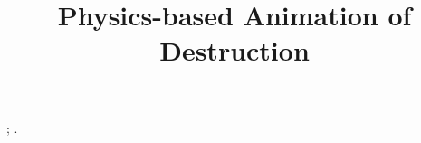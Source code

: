 \documentclass[review]{acmsiggraph-job}
\title{Physics-based Animation of Destruction}
\author{}
\newcommand{\theKeywords}{}
\begin{document}


\maketitle

\begin{abstract}
\end{abstract}
\begin{CRcatlist}
  ;
  .
\end{CRcatlist}

\keywordlist{\theKeywords}

\TOGlinkslist


\newcommand{\adam}[1]{{\color{AdamColor} #1}}

\newcommand{\etal}{and colleagues}
\newcommand{\Mueller}{M\"uller}
\newcommand{\BM}[1]{\B{#1}}
\newcommand{\B}[1]{\mathit{\mathbf{#1}}}
\newcommand{\Per}{\%}
\newcommand{\Unit}[1]{{\mbox{$\,\mathrm{#1}$}}}
\newcommand{\Snit}[1]{{\mbox{\small$\mathrm{#1}$}}}
\newcommand{\Tr}[1]{\mathrm{Tr}\left(#1\right)}
\newcommand{\Hz}{\Unit{Hz}}
\newcommand{\MHz}{\Unit{MHz}}
\newcommand{\GHz}{\Unit{GHz}}
\newcommand{\Sec}{\Unit{sec}}
\newcommand{\SPF}{\Unit{sec/frame}}
\newcommand{\Min}{\Unit{min}}
\newcommand{\Max}{\Unit{max}}
\newcommand{\M}{\Unit{m}}
\newcommand{\Nab}{\B{\nabla}}
\newcommand{\TP}{^\mathsf{T}}

\newcommand{\Dist}{\mbox{dist}}

\newcommand{\figureTopBot}[1]{
  \begin{figure}[!tb]{\sloppy #1}\end{figure}
}

\newcommand{\figureTop}[1]{
  \begin{figure}[!t]{\sloppy #1}\end{figure}
}
 
\newcommand{\figureBot}[1]{
  \begin{figure}[!b]{\sloppy #1}\end{figure}
}
\end{document}
